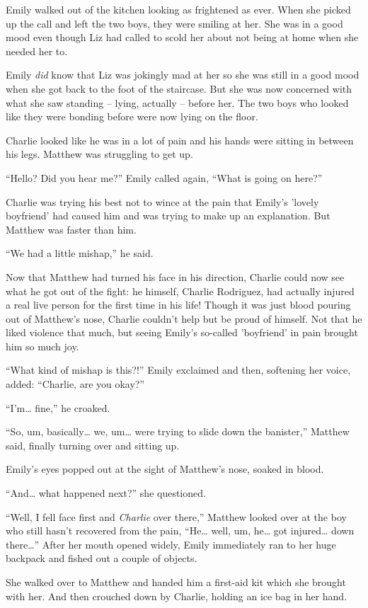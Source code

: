 Emily walked out of the kitchen looking as frightened as ever. When she picked up the call and left the two boys, they were smiling at her. She was in a good mood even though Liz had called to scold her about not being at home when she needed her to.

Emily \textit{did} know that Liz was jokingly mad at her so she was still in a good mood when she got back to the foot of the staircase. But she was now concerned with what she saw standing – lying, actually – before her. The two boys who looked like they were bonding before were now lying on the floor.

Charlie looked like he was in a lot of pain and his hands were sitting in between his legs. Matthew was struggling to get up.

“Hello? Did you hear me?” Emily called again, “What is going on here?”

Charlie was trying his best not to wince at the pain that Emily's 'lovely boyfriend' had caused him and was trying to make up an explanation. But Matthew was faster than him.

“We had a little mishap,” he said.

Now that Matthew had turned his face in his direction, Charlie could now see what he got out of the fight: he himself, Charlie Rodriguez, had actually injured a real live person for the first time in his life! Though it was just blood pouring out of Matthew's nose, Charlie couldn't help but be proud of himself. Not that he liked violence that much, but seeing Emily's so-called 'boyfriend' in pain brought him so much joy.

“What kind of mishap is this?!” Emily exclaimed and then, softening her voice, added: “Charlie, are you okay?”

“I'm… fine,” he croaked.

“So, um, basically… we, um… were trying to slide down the banister,” Matthew said, finally turning over and sitting up.

Emily's eyes popped out at the sight of Matthew's nose, soaked in blood.

“And… what happened next?” she questioned.

“Well, I fell face first and \textit{Charlie} over there,” Matthew looked over at the boy who still hasn't recovered from the pain, “He… well, um, he… got injured… down there…”
After her mouth opened widely, Emily immediately ran to her huge backpack and fished out a couple of objects.

She walked over to Matthew and handed him a first-aid kit which she brought with her. And then crouched down by Charlie, holding an ice bag in her hand.

